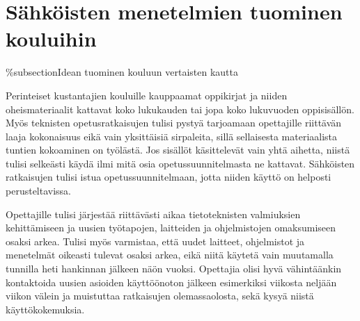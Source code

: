 \documentclass[utf8,bachelor]{gradu3}
\begin{document}







\section{Sähköisten menetelmien tuominen kouluihin}
\%subsection{Idean tuominen kouluun vertaisten kautta}


Perinteiset kustantajien kouluille kauppaamat oppikirjat ja niiden oheismateriaalit kattavat koko lukukauden tai jopa koko lukuvuoden oppisisällön. Myös teknisten opetusratkaisujen tulisi pystyä tarjoamaan opettajille riittävän laaja kokonaisuus eikä vain yksittäisiä sirpaleita, sillä sellaisesta materiaalista tuntien kokoaminen on työlästä. Jos sisällöt käsittelevät vain yhtä aihetta, niistä tulisi selkeästi käydä ilmi mitä osia opetussuunnitelmasta ne kattavat. Sähköisten ratkaisujen tulisi istua opetussuunnitelmaan, jotta niiden käyttö on helposti perusteltavissa.

Opettajille tulisi järjestää riittävästi aikaa tietoteknisten valmiuksien kehittämiseen ja uusien työtapojen, laitteiden ja ohjelmistojen omaksumiseen osaksi arkea. Tulisi myös varmistaa, että uudet laitteet, ohjelmistot ja menetelmät oikeasti tulevat osaksi arkea, eikä niitä käytetä vain muutamalla tunnilla heti hankinnan jälkeen näön vuoksi. Opettajia olisi hyvä vähintäänkin kontaktoida uusien asioiden käyttöönoton jälkeen esimerkiksi viikosta neljään viikon välein ja muistuttaa ratkaisujen olemassaolosta, sekä kysyä niistä käyttökokemuksia.
\end{document}
